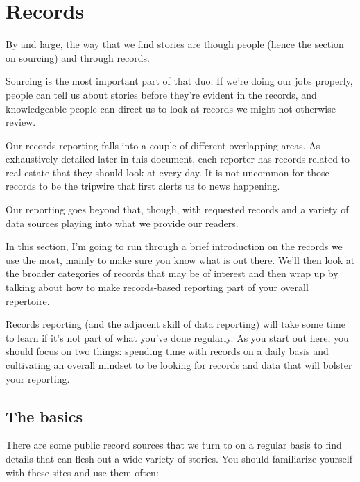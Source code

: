 \documentclass[
  11pt,
  american,
  letterpaperpaper,
  extrafontsizes,onecolumn,openright
  ]{memoir}
\begin{document}
\hypertarget{records}{%
\chapter{Records}\label{records}}

By and large, the way that we find stories are though people (hence the section on sourcing) and through records.

Sourcing is the most important part of that duo: If we're doing our jobs properly, people can tell us about stories before they're evident in the records, and knowledgeable people can direct us to look at records we might not otherwise review.

Our records reporting falls into a couple of different overlapping areas. As exhaustively detailed later in this document, each reporter has records related to real estate that they should look at every day. It is not uncommon for those records to be the tripwire that first alerts us to news happening.

Our reporting goes beyond that, though, with requested records and a variety of data sources playing into what we provide our readers.

In this section, I'm going to run through a brief introduction on the records we use the most, mainly to make sure you know what is out there. We'll then look at the broader categories of records that may be of interest and then wrap up by talking about how to make records-based reporting part of your overall repertoire.

\leavevmode{}%
\begin{greybox}[frametitle=Onboarding Path]
Records reporting (and the adjacent skill of data reporting) will take some time to learn if it's not part of what you've done regularly. As you start out here, you should focus on two things: spending time with records on a daily basis and cultivating an overall mindset to be looking for records and data that will bolster your reporting.

\end{greybox}

\hypertarget{the-basics}{%
\section*{The basics}\label{the-basics}}

There are some public record sources that we turn to on a regular basis to find details that can flesh out a wide variety of stories. You should familiarize yourself with these sites and use them often:
\end{document}
